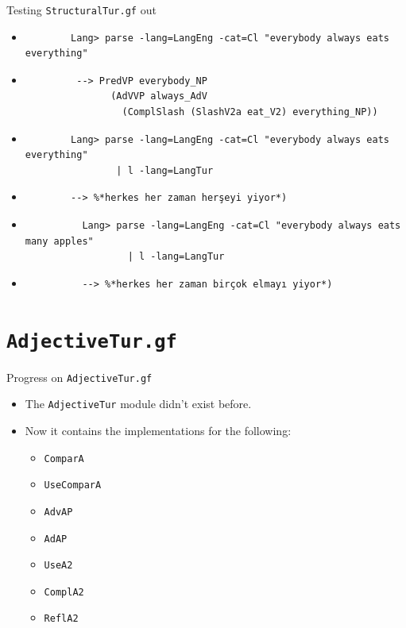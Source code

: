 \documentclass{beamer}
\begin{document}
  \begin{frame}[fragile]{Testing \texttt{StructuralTur.gf} out}
    \begin{itemize}
      \item<1->
        \begin{lstlisting}
        Lang> parse -lang=LangEng -cat=Cl "everybody always eats everything"
        \end{lstlisting}
      \item<2->
        \begin{lstlisting}
         --> PredVP everybody_NP
               (AdVVP always_AdV
                 (ComplSlash (SlashV2a eat_V2) everything_NP))
        \end{lstlisting}
      \item<3->
        \begin{lstlisting}
        Lang> parse -lang=LangEng -cat=Cl "everybody always eats everything"
                | l -lang=LangTur
        \end{lstlisting}
      \item<4->
        \begin{lstlisting}
        --> %*herkes her zaman herşeyi yiyor*)
        \end{lstlisting}
      \item<5->
        \begin{lstlisting}
          Lang> parse -lang=LangEng -cat=Cl "everybody always eats many apples"
                  | l -lang=LangTur
        \end{lstlisting}
      \item<6->
        \begin{lstlisting}
          --> %*herkes her zaman birçok elmayı yiyor*)
        \end{lstlisting}
    \end{itemize}
  \end{frame}

  \section{\texttt{AdjectiveTur.gf}}

  \begin{frame}{Progress on \texttt{AdjectiveTur.gf}}
    \begin{itemize}
      \item<1-> The \texttt{AdjectiveTur} module didn't exist before.
      \item<2-> Now it contains the implementations for the following:
        \begin{itemize}
          \item \texttt{ComparA}
          \item \texttt{UseComparA}
          \item \texttt{AdvAP}
          \item \texttt{AdAP}
          \item \texttt{UseA2}
          \item \texttt{ComplA2}
          \item \texttt{ReflA2}
        \end{itemize}
    \end{itemize}
  \end{frame}
\end{document}
